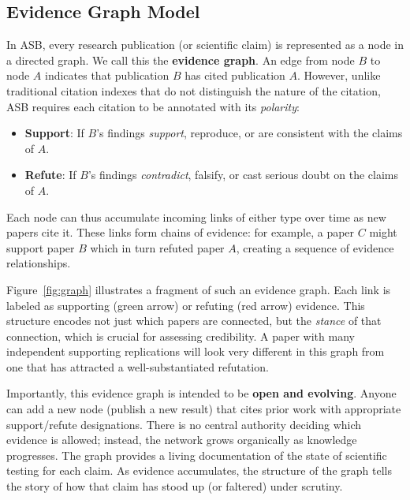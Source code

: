 \documentclass{article}
\begin{document}
\subsection{Evidence Graph Model}
In ASB, every research publication (or scientific claim) is represented as a node in a directed graph. We call this the \textbf{evidence graph}. An edge from node $B$ to node $A$ indicates that publication $B$ has cited publication $A$. However, unlike traditional citation indexes that do not distinguish the nature of the citation, ASB requires each citation to be annotated with its \emph{polarity}:
\begin{itemize}
    \item \textbf{Support}: If $B$'s findings \textit{support}, reproduce, or are consistent with the claims of $A$.
    \item \textbf{Refute}: If $B$'s findings \textit{contradict}, falsify, or cast serious doubt on the claims of $A$.
\end{itemize}
Each node can thus accumulate incoming links of either type over time as new papers cite it. These links form chains of evidence: for example, a paper $C$ might support paper $B$ which in turn refuted paper $A$, creating a sequence of evidence relationships.

Figure~\ref{fig:graph} illustrates a fragment of such an evidence graph. Each link is labeled as supporting (green arrow) or refuting (red arrow) evidence. This structure encodes not just which papers are connected, but the \emph{stance} of that connection, which is crucial for assessing credibility. A paper with many independent supporting replications will look very different in this graph from one that has attracted a well-substantiated refutation.

Importantly, this evidence graph is intended to be \textbf{open and evolving}. Anyone can add a new node (publish a new result) that cites prior work with appropriate support/refute designations. There is no central authority deciding which evidence is allowed; instead, the network grows organically as knowledge progresses. The graph provides a living documentation of the state of scientific testing for each claim. As evidence accumulates, the structure of the graph tells the story of how that claim has stood up (or faltered) under scrutiny.
\end{document}
